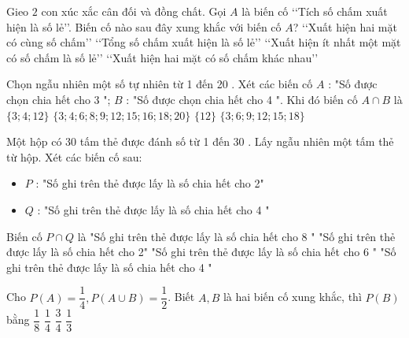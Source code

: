 \begin{ex}%
	Gieo $2$ con xúc xắc cân đối và đồng chất. Gọi $A$ là biến cố \lq\lq  Tích số chấm xuất hiện là số lẻ\rq\rq. Biến cố nào sau đây xung khắc với biến cố $A$?
	\choice
	{\lq\lq  Xuất hiện hai mặt có cùng số chấm\rq\rq}
	{\True \lq\lq  Tổng số chấm xuất hiện là số lẻ\rq\rq}
	{\lq\lq  Xuất hiện ít nhất một mặt có số chấm là số lẻ\rq\rq}
	{\lq\lq  Xuất hiện hai mặt có số chấm khác nhau\rq\rq}
\end{ex}


\begin{ex}
	Chọn ngẫu nhiên một số tự nhiên từ 1 đến 20 . Xét các biến cố $A$ : "Số được chọn chia hết cho 3 "; $B$ : "Số được chọn chia hết cho 4 ". Khi đó biến cố $A \cap B$ là
	\choice
	{$\{3 ; 4 ; 12\}$}
	{$\{3 ; 4 ; 6 ; 8 ; 9 ; 12 ; 15 ; 16 ; 18 ; 20\}$}
	{\True  $\{12\}$}
	{$\{3 ; 6 ; 9 ; 12 ; 15 ; 18\}$}
\end{ex}

\begin{ex}
	Một hộp có 30 tấm thẻ được đánh số từ 1 đến 30 . Lấy ngẫu nhiên một tấm thẻ từ hộp. Xét các biến cố sau:
	\begin{itemize}
		\item [] $P$ : "Số ghi trên thẻ được lấy là số chia hết cho 2"
		\item [] $Q$ : "Số ghi trên thẻ được lấy là số chia hết cho 4 "
	\end{itemize}
Biến cố $P \cap Q$ là
	\choice
	{\True "Số ghi trên thẻ được lấy là số chia hết cho 8 "}
	{"Số ghi trên thẻ được lấy là số chia hết cho 2"}
	{"Số ghi trên thẻ được lấy là số chia hết cho 6 "}
	{\True "Số ghi trên thẻ được lấy là số chia hết cho 4 "}
\end{ex}

\begin{ex}
	Cho $P(A)=\dfrac{1}{4}, P(A \cup B)=\dfrac{1}{2}$. Biết $A, B$ là hai biến cố xung khắc, thì $P(B)$ bằng
	\choice
	{ $\dfrac{1}{8}$}
	{\True $\dfrac{1}{4}$}
	{$\dfrac{3}{4}$}
	{$\dfrac{1}{3}$}
\end{ex}

